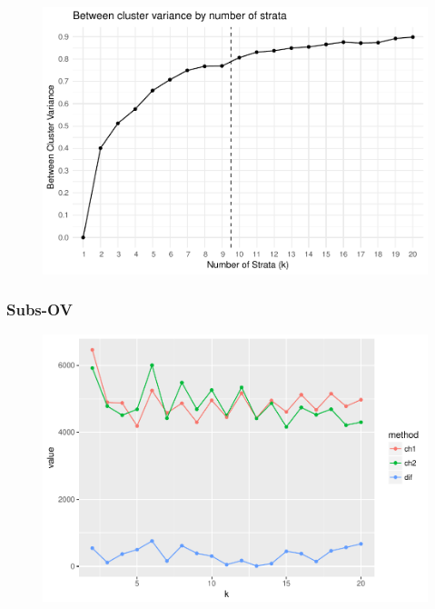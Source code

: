 \documentclass[floatsintext,man]{apa6}
\theoremstyle{definition}
\theoremstyle{definition}
\theoremstyle{definition}
\theoremstyle{remark}
\begin{document}
\begin{figure}
\centering
\includegraphics{Method_files/figure-latex/SUBS_FULL_SSB/SST-1.pdf}
\caption{}
\end{figure}

\subsubsection{Subs-OV}\label{subs-ov}

\begin{figure}
\centering
\includegraphics{Method_files/figure-latex/SUBS_OV_CH-1.pdf}
\caption{}
\end{figure}
\end{document}
